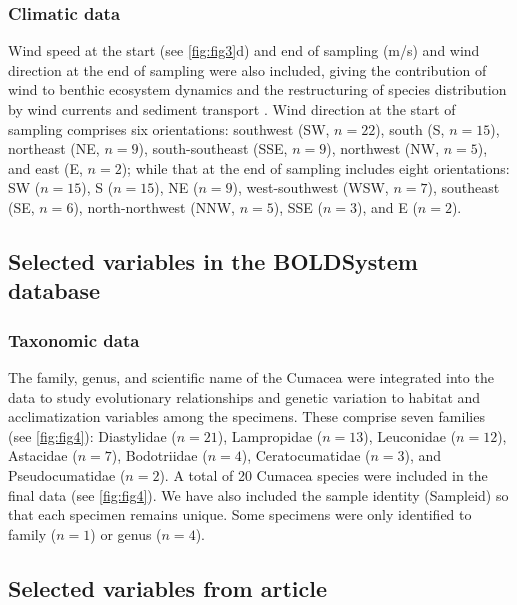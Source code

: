 \subsubsection{Climatic data}
Wind speed at the start (see \autoref{fig:fig3}d) and end of sampling (m/s) and wind direction at the end of sampling were also included, giving the contribution of wind to benthic ecosystem dynamics and the restructuring of species distribution by wind currents and sediment transport \citep{siedlecki2016experiments, waga_recent_2020,saeedi_environmental_2022}. Wind direction at the start of sampling comprises six orientations: southwest (SW, $n=22$), south (S, $n=15$), northeast (NE, $n=9$), south-southeast (SSE, $n=9$), northwest (NW, $n=5$), and east (E, $n=2$); while that at the end of sampling includes eight orientations: SW ($n=15$), S ($n=15$), NE ($n=9$), west-southwest (WSW, $n=7$), southeast (SE, $n=6$), north-northwest (NNW, $n=5$), SSE ($n=3$), and E ($n=2$).

\subsection{Selected variables in the BOLDSystem database}
\subsubsection{Taxonomic data}
The family, genus, and scientific name of the Cumacea were integrated into the data to study evolutionary relationships and genetic variation to habitat and acclimatization variables among the specimens. These comprise seven families (see \autoref{fig:fig4}): Diastylidae ($n=21$), Lampropidae ($n=13$), Leuconidae ($n=12$), Astacidae ($n=7$), Bodotriidae ($n=4$), Ceratocumatidae ($n=3$), and Pseudocumatidae ($n=2$). A total of 20 Cumacea species were included in the final data (see \autoref{fig:fig4}). We have also included the sample identity (Sampleid) so that each specimen remains unique. Some specimens were only identified to family ($n=1$) or genus ($n=4$).

\subsection{Selected variables from article \cite{uhlir_adding_2021}}
